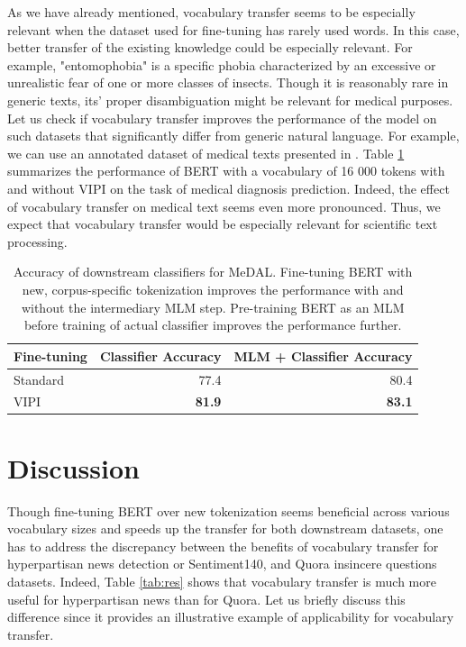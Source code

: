 \documentclass[review]{elsarticle}
\begin{document}
As we have already mentioned, vocabulary transfer seems to be especially relevant when the dataset used for fine-tuning has rarely used words. In this case, better transfer of the existing knowledge could be especially relevant. For example, "entomophobia" is a specific phobia characterized by an excessive or unrealistic fear of one or more classes of insects. Though it is reasonably rare in generic texts, its' proper disambiguation might be relevant for medical purposes. Let us check if vocabulary transfer improves the performance of the model on such datasets that significantly differ from generic natural language. For example, we can use an annotated dataset of medical texts presented in \cite{Wen2020MeDALMA}. Table \ref{tab:med} summarizes the performance of BERT with a vocabulary of 16 000 tokens with and without VIPI on the task of medical diagnosis prediction. Indeed, the effect of vocabulary transfer on medical text seems even more pronounced. Thus, we expect that vocabulary transfer would be especially relevant for scientific text processing.

\begin{table}[h]
\centering
\begin{tabular}{lrr}
 Fine-tuning & Classifier Accuracy & MLM + Classifier Accuracy \\
\hline
 Standard &77.4 & 80.4\\
 VIPI & \textbf{81.9} & \textbf{83.1}\\
\hline
\end{tabular}
\caption{Accuracy of downstream classifiers for MeDAL. Fine-tuning BERT with new, corpus-specific tokenization improves the performance with and without the intermediary MLM step. Pre-training BERT as an MLM before training of actual classifier improves the performance further.}
\label{tab:med}
\end{table}

\section{Discussion}
\label{sec:dis}

 Though fine-tuning BERT over new tokenization seems beneficial across various vocabulary sizes and speeds up the transfer for both downstream datasets, one has to address the discrepancy between the benefits of vocabulary transfer for hyperpartisan news detection or Sentiment140, and Quora insincere questions datasets. Indeed, Table \ref{tab:res} shows that vocabulary transfer is much more useful for hyperpartisan news than for Quora. Let us briefly discuss this difference since it provides an illustrative example of applicability for vocabulary transfer.
 
\end{document}
